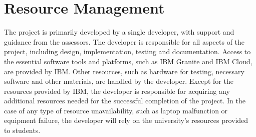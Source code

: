 \documentclass[12pt]{article}
\begin{document}
\section{Resource Management}

    The project is primarily developed by a single developer, with support and guidance from the assessors. The developer is responsible for all aspects of the project, including design, implementation, testing and documentation.
    Access to the essential software tools and platforms, such as IBM Granite and IBM Cloud, are provided by IBM. Other resources, such as hardware for testing, necessary software and other materials, are handled by the developer. Except for the
    resources provided by IBM, the developer is responsible for acquiring any additional resources needed for the successful completion of the project. In the case of any type of resource unavailability, such as laptop malfunction or equipment failure, the
    developer will rely on the university's resources provided to students.
\end{document}
